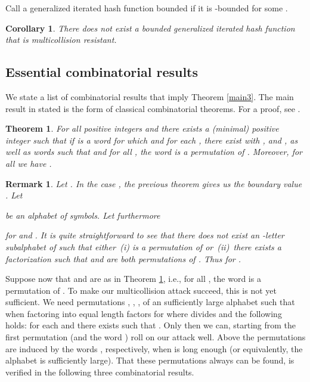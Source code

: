 \documentclass[submission,copyright,creativecommons]{eptcs}
\newtheorem{theorem}{Theorem}
\newtheorem{remark}{Rermark}
\newtheorem{corollary}{Corollary}
\begin{document}
Call a generalized iterated hash function bounded if it is -bounded for some . 

\begin{corollary}
There does not exist a bounded generalized iterated hash function that is multicollision resistant.
\end{corollary}

\subsection{Essential combinatorial results}

We state a list of combinatorial results that imply Theorem \ref{main3}. The main result in stated is the form of classical combinatorial theorems. For a proof, see \cite{KKV}.  

\begin{theorem} \label{main1}
For all positive integers   and  there exists a (minimal) positive integer  such that if  is a word
for which  and  for
each , there exist 
with , and , as well as words
 such that  and for all , the word  is a permutation of . Moreover, for all  we have .
\end{theorem}


\begin{remark} \label{rem1}
Let . In the case , the previous theorem gives us the boundary value . Let 

be an alphabet of  symbols. Let furthermore 

for  and . It is quite straightforward to see that there does not exist an -letter subalphabet of  such that either\, (i)  is a permutation of  or\  \hbox{(ii) there} exists a factorization  such that  and  are both permutations of . Thus  for . 
\end{remark}

Suppose now that  and  are as in Theorem \ref{main1}, i.e., for all , the word  is a permutation of . To make our multicollision attack succeed, this is not yet sufficient. We need permutations  , , ,  of an sufficiently large alphabet  such that when factoring  into   equal length factors for  where  divides  and the following holds: for each  and  there exists  such that . Only then we can, starting from the first permutation (and the word ) roll on our attack well. Above the permutations  are induced by the words , respectively, when  is long enough (or equivalently, the alphabet  is sufficiently large). That these permutations always can be found, is verified in the following three combinatorial results. 
\end{document}
